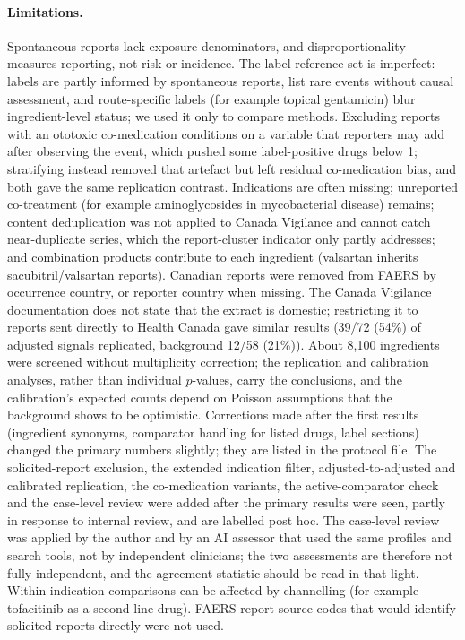 \paragraph{Limitations.} Spontaneous reports lack exposure denominators, and disproportionality measures reporting, not risk
or incidence. The label reference set is imperfect: labels are partly informed by spontaneous reports, list rare events
without causal assessment, and route-specific labels (for example topical gentamicin) blur ingredient-level status; we used it
only to compare methods. Excluding reports with an ototoxic co-medication conditions on a variable that reporters may add
after observing the event, which pushed some label-positive drugs below 1; stratifying instead removed that artefact but left
residual co-medication bias, and both gave the same replication contrast. Indications are often missing; unreported
co-treatment (for example aminoglycosides in mycobacterial disease) remains; content deduplication was not applied to Canada
Vigilance and cannot catch near-duplicate series, which the report-cluster indicator only partly addresses; and combination
products contribute to each ingredient (valsartan inherits sacubitril/valsartan reports). Canadian reports were removed from
FAERS by occurrence country, or reporter country when missing. The Canada Vigilance documentation does not state that the
extract is domestic; restricting it to reports sent directly to Health Canada gave similar results
(39/72 (54\%) of adjusted signals replicated, background
12/58 (21\%)). About 8{,}100 ingredients were screened without
multiplicity correction; the replication and calibration analyses, rather than individual $p$-values, carry the conclusions,
and the calibration's expected counts depend on Poisson assumptions that the background shows to be optimistic. Corrections
made after the first results (ingredient synonyms, comparator handling for listed drugs, label sections) changed the primary
numbers slightly; they are listed in the protocol file. The solicited-report exclusion, the extended indication filter,
adjusted-to-adjusted and calibrated replication, the co-medication variants, the active-comparator check and the case-level
review were added after the primary results were seen, partly in response to internal review, and are labelled post hoc. The
case-level review was applied by the author and by an AI assessor that used the same profiles and search tools, not by
independent clinicians; the two assessments are therefore not fully independent, and the agreement statistic should be read
in that light. Within-indication comparisons can be affected by channelling (for example tofacitinib as a second-line drug).
FAERS report-source codes that would identify solicited reports directly were not used.

